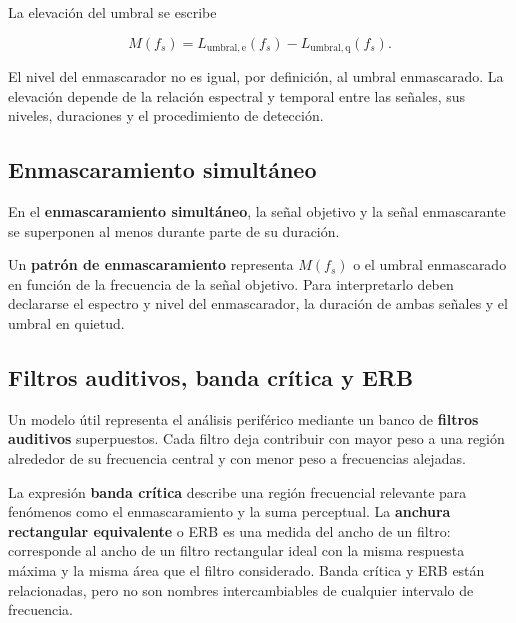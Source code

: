 La elevación del umbral se escribe

\begin{equation}
    M(f_s)
      =L_{\mathrm{umbral,e}}(f_s)
       -L_{\mathrm{umbral,q}}(f_s).
    \label{eq:u7-elevacion-umbral}
\end{equation}

El nivel del enmascarador no es igual, por definición, al umbral enmascarado.
La elevación depende de la relación espectral y temporal entre las señales,
sus niveles, duraciones y el procedimiento de detección.

\subsection{Enmascaramiento simultáneo}
\label{sec:u7-enmascaramiento-simultaneo}

En el \textbf{enmascaramiento simultáneo}, la señal objetivo y la señal
enmascarante se superponen al menos durante parte de su duración.

Un \textbf{patrón de enmascaramiento} representa \(M(f_s)\) o el umbral
enmascarado en función de la frecuencia de la señal objetivo. Para
interpretarlo deben declararse el espectro y nivel del enmascarador, la
duración de ambas señales y el umbral en quietud.

\subsection{Filtros auditivos, banda crítica y ERB}
\label{sec:u7-filtros-auditivos}

Un modelo útil representa el análisis periférico mediante un banco de
\textbf{filtros auditivos} superpuestos. Cada filtro deja contribuir con mayor
peso a una región alrededor de su frecuencia central y con menor peso a
frecuencias alejadas.

La expresión \textbf{banda crítica} describe una región frecuencial relevante
para fenómenos como el enmascaramiento y la suma perceptual. La
\textbf{anchura rectangular equivalente} o ERB es una medida del ancho de un
filtro: corresponde al ancho de un filtro rectangular ideal con la misma
respuesta máxima y la misma área que el filtro considerado. Banda crítica y
ERB están relacionadas, pero no son nombres intercambiables de cualquier
intervalo de frecuencia.

